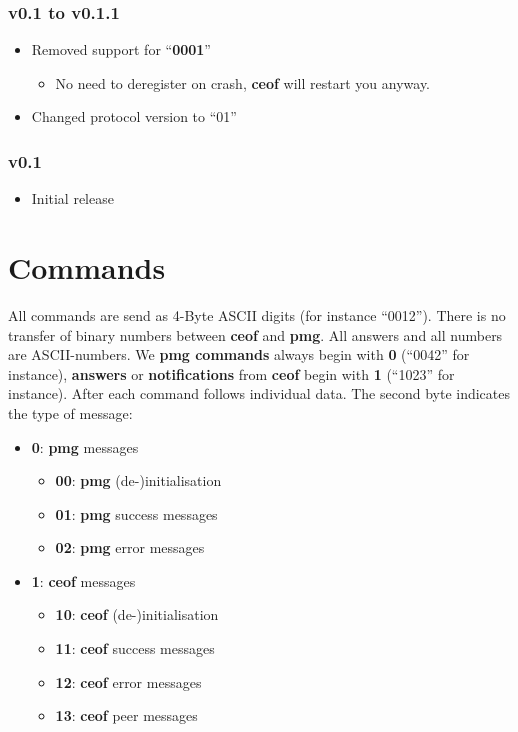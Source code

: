 \documentclass[12pt,a4paper]{book}
\begin{document}
\subsubsection{v0.1 to v0.1.1}
\begin{itemize}
\item Removed support for "`\textbf{0001}"'
\begin{itemize}
\item No need to deregister on crash, \textbf{ceof} will restart you anyway.
\end{itemize}
\item Changed protocol version to "`01"'
\end{itemize}
\subsubsection{v0.1}
\begin{itemize}
\item Initial release
\end{itemize}
\section{Commands}
All commands are send as 4-Byte ASCII digits (for instance "`0012"').
There is no transfer of binary numbers between \textbf{ceof} and \textbf{pmg}.
All answers and all numbers are ASCII-numbers. We
\textbf{pmg commands} always begin with \textbf{0} ("`0042"' for instance),
\textbf{answers} or \textbf{notifications} from
\textbf{ceof} begin with \textbf{1} ("`1023"' for instance).
After each command follows individual data. The second byte indicates the type of message:
\begin{itemize}
\item \textbf{0}: \textbf{pmg} messages
\begin{itemize}
\item \textbf{00}: \textbf{pmg} (de-)initialisation
\item \textbf{01}: \textbf{pmg} success messages
\item \textbf{02}: \textbf{pmg} error messages
\end{itemize}
\item \textbf{1}: \textbf{ceof} messages
\begin{itemize}
\item \textbf{10}: \textbf{ceof} (de-)initialisation
\item \textbf{11}: \textbf{ceof} success messages
\item \textbf{12}: \textbf{ceof} error messages
\item \textbf{13}: \textbf{ceof} peer messages
\end{itemize}
\end{itemize}
\end{document}
